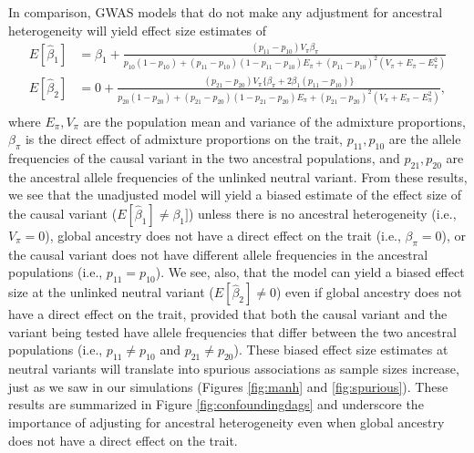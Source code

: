\documentclass[12pt]{article}
\begin{document}
In comparison, GWAS models that do not make any adjustment for ancestral heterogeneity will yield effect size estimates of
\begin{equation}
\begin{aligned}
E[\hat\beta_1] & = \beta_1 + \frac{(p_{11}- p_{10})V_\pi \beta_\pi }{p_{10}(1-p_{10}) + (p_{11}-p_{10})(1-p_{11}-p_{10})E_\pi + (p_{11}-p_{10})^2(V_\pi + E_\pi - E_\pi^2)} \\
E[\hat\beta_2] & = 0 + \frac{(p_{21}-p_{20}) V_\pi\{\beta_\pi + 2\beta_1(p_{11}- p_{10})\}}{p_{20}(1-p_{20}) + (p_{21}-p_{20})(1-p_{21}-p_{20})E_\pi + (p_{21}-p_{20})^2(V_\pi + E_\pi - E_\pi^2)},\\
\end{aligned}
\label{eqn:unadjusted}
\end{equation}
where $E_\pi, V_\pi$ are the population mean and variance of the admixture proportions, $\beta_\pi$ is the direct effect of admixture proportions on the trait, $p_{11}, p_{10}$ are the allele frequencies of the causal variant in the two ancestral populations, and $p_{21}, p_{20}$ are the ancestral allele frequencies of the unlinked neutral variant.
From these results, we see that the unadjusted model will yield a biased estimate of the effect size of the causal variant ($E[\hat\beta_1] \neq \beta_1]$) unless there is no ancestral heterogeneity (i.e., $V_\pi = 0$), global ancestry does not have a direct effect on the trait (i.e., $\beta_\pi = 0$), or the causal variant does not have different allele frequencies in the ancestral populations (i.e., $p_{11} = p_{10}$). 
We see, also, that the model can yield a biased effect size at the unlinked neutral variant ($E[\hat\beta_2] \neq 0$) even if global ancestry does not have a direct effect on the trait, provided that both the causal variant and the variant being tested have allele frequencies that differ between the two ancestral populations (i.e., $p_{11} \neq p_{10}$ and $p_{21} \neq p_{20}$).
These biased effect size estimates at neutral variants will translate into spurious associations as sample sizes increase, just as we saw in our simulations (Figures \ref{fig:manh} and \ref{fig:spurious}).
These results are summarized in Figure \ref{fig:confoundingdags} and underscore the importance of adjusting for ancestral heterogeneity even when global ancestry does not have a direct effect on the trait.
\end{document}

